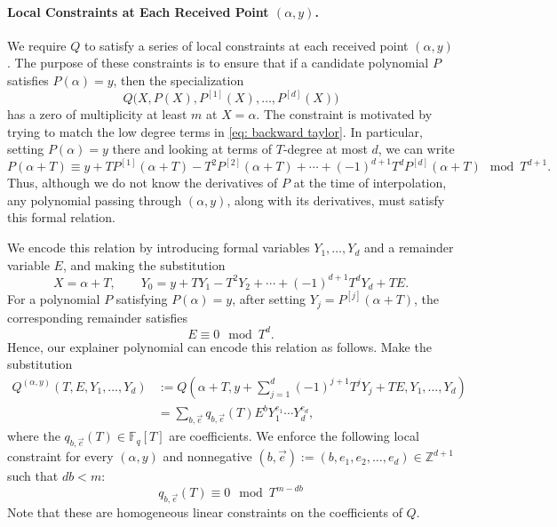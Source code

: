 \documentclass[11pt]{article}
\newcommand{\F}{\mathbb F}
\newcommand{\josh}[1]{{\color{green!50!black} {{[Josh: #1]}}}}
\begin{document}
\paragraph{Local Constraints at Each Received Point $(\alpha,y)$.}
We require $Q$ to satisfy a series of local constraints at each received point $(\alpha,y)$.
The purpose of these constraints is to ensure that if a candidate polynomial $P$ satisfies
$P(\alpha)=y$, then the specialization
\[
Q\bigl(X,P(X),P^{[1]}(X),\ldots,P^{[d]}(X)\bigr)
\]
has a zero of multiplicity at least $m$ at $X=\alpha$. The constraint is motivated by trying to match the low degree terms in \eqref{eq: backward taylor}. In particular, setting $P(\alpha)=y$ there and looking at terms of $T$-degree at most $d$, we can write
\begin{equation} \label{eq: backward taylor}
P(\alpha+T)
\equiv
y
+TP^{[1]}(\alpha+T)
-T^2P^{[2]}(\alpha+T)
+\cdots
+(-1)^{d+1}T^dP^{[d]}(\alpha+T)
\mod{T^{d+1}}.
\end{equation}
Thus, although we do not know the derivatives of $P$ at the time of
interpolation, any polynomial passing through $(\alpha,y)$, along with its derivatives, must satisfy this formal relation.

We encode this relation by introducing formal variables
$Y_1,\ldots,Y_d$ and a remainder variable $E$, and making the substitution
\[
X=\alpha+T,
\qquad
Y_0
=
y+TY_1-T^2Y_2+\cdots+(-1)^{d+1}T^dY_d+TE.
\]
For a polynomial $P$ satisfying $P(\alpha)=y$, after setting $Y_j=P^{[j]}(\alpha+T)$,
the corresponding remainder satisfies
\[
E\equiv0\mod{T^d}.
\]
Hence, our explainer polynomial can encode this relation as follows. Make the substitution
\begin{equation}\label{eq:local-Q-expand}
  \begin{split}
  Q^{(\alpha,y)}(T,E,Y_1,\ldots,Y_d)
  &:=
  Q\left(\alpha+T,
    y+\sum_{j=1}^{d}(-1)^{j+1}T^jY_j+TE,
    Y_1,\ldots,Y_d\right) \\
  &=\sum_{b,\vec{e}}q_{b,\vec{e}}(T)E^bY_1^{e_1}\cdots Y_d^{e_d},
  \end{split}
\end{equation}
where the $q_{b,\vec{e}}(T) \in \F_q[T]$ are coefficients. We enforce the following local constraint for every $(\alpha,y)$ and nonnegative $(b,\vec{e}):=(b,e_1,e_2,\dots,e_d) \in \mathbb{Z}^{d+1}$ such that $db<m$:
\begin{equation}\label{eq:local-condition}
  q_{b,\vec{e}}(T)\equiv0\mod{T^{m-db}}
\end{equation}
Note that these are homogeneous linear constraints on the coefficients of \(Q\).
\end{document}
